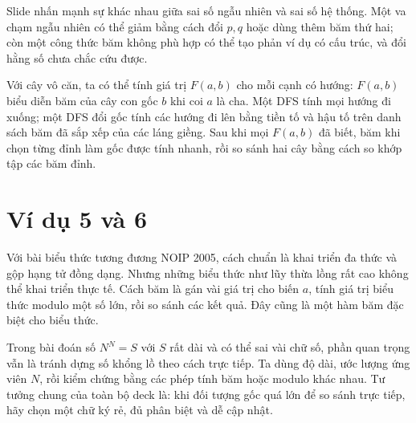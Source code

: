 \documentclass[11pt]{article}
\begin{document}
Slide nhấn mạnh sự khác nhau giữa sai số ngẫu nhiên và sai số hệ thống. Một
va chạm ngẫu nhiên có thể giảm bằng cách đổi \(p,q\) hoặc dùng thêm băm thứ
hai; còn một công thức băm không phù hợp có thể tạo phản ví dụ có cấu trúc,
và đổi hằng số chưa chắc cứu được.

Với cây vô căn, ta có thể tính giá trị \(F(a,b)\) cho mỗi cạnh có hướng:
\(F(a,b)\) biểu diễn băm của cây con gốc \(b\) khi coi \(a\) là cha. Một DFS
tính mọi hướng đi xuống; một DFS đổi gốc tính các hướng đi lên bằng tiền tố
và hậu tố trên danh sách băm đã sắp xếp của các láng giềng. Sau khi mọi
\(F(a,b)\) đã biết, băm khi chọn từng đỉnh làm gốc được tính nhanh, rồi so
sánh hai cây bằng cách so khớp tập các băm đỉnh.

\section{Ví dụ 5 và 6}

Với bài biểu thức tương đương NOIP 2005, cách chuẩn là khai triển đa thức và
gộp hạng tử đồng dạng. Nhưng những biểu thức như lũy thừa lồng rất cao không
thể khai triển thực tế. Cách băm là gán vài giá trị cho biến \(a\), tính giá
trị biểu thức modulo một số lớn, rồi so sánh các kết quả. Đây cũng là một
hàm băm đặc biệt cho biểu thức.

Trong bài đoán số \(N^N=S\) với \(S\) rất dài và có thể sai vài chữ số, phần
quan trọng vẫn là tránh dựng số khổng lồ theo cách trực tiếp. Ta dùng độ dài,
ước lượng ứng viên \(N\), rồi kiểm chứng bằng các phép tính băm hoặc modulo
khác nhau. Tư tưởng chung của toàn bộ deck là: khi đối tượng gốc quá lớn để
so sánh trực tiếp, hãy chọn một chữ ký rẻ, đủ phân biệt và dễ cập nhật.
\end{document}
